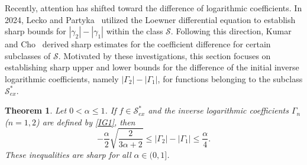 \documentclass[11pt,reqno]{amsart}
\newtheorem{theo}{Theorem}[section]
\numberwithin{equation}{section}
\begin{document}
Recently, attention has shifted toward the difference of logarithmic coefficients. In 2024, Lecko and Partyka~\cite{Lecko2023} utilized the Loewner differential equation to establish sharp bounds for $|\gamma_2| - |\gamma_1|$ within the class $\mathcal{S}$. Following this direction, Kumar and Cho~\cite{Kumar2023} derived sharp estimates for the coefficient difference for certain subclasses of $\mathcal{S}$. Motivated by these investigations, this section focuses on establishing sharp upper and lower bounds for the difference of the initial inverse logarithmic coefficients, namely $|\Gamma_2| - |\Gamma_1|$, for functions belonging to the subclass $\mathcal{S}_{ex}^{\ast}$.

\begin{theo}\label{T2}
Let $0 < \alpha \le 1$. If $f \in \mathcal{S}_{ex}^{\ast}$ and the inverse logarithmic coefficients $\Gamma_n$ ($n = 1,2$) are defined by \eqref{IG1}, then
\begin{equation}\label{ND15}
-\frac{\alpha}{2}\sqrt{\frac{2}{3\alpha + 2}} \le |\Gamma_2|-|\Gamma_1| \le \frac{\alpha}{4}.
\end{equation}
These inequalities are sharp for all $\alpha \in (0,1]$.
\end{theo}
\end{document}
